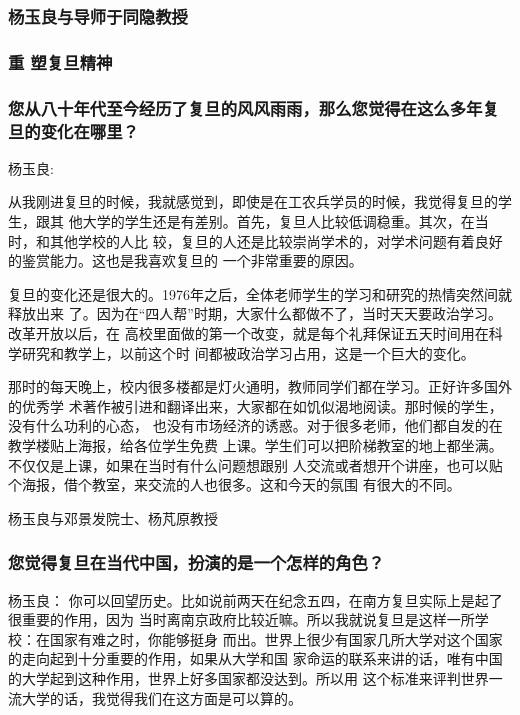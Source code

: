 \documentclass[11pt]{ctexart}
\begin{document}
{{{{\subsubsection{杨玉良与导师于同隐教授}
\label{sec:org4cb509a}
\subsubsection{重 塑复旦精神}
\label{sec:org80a453c}

\subsubsection{您从八十年代至今经历了复旦的风风雨雨，那么您觉得在这么多年复旦的变化在哪里？}
\label{sec:org972734c}
杨玉良:

从我刚进复旦的时候，我就感觉到，即使是在工农兵学员的时候，我觉得复旦的学生，跟其
他大学的学生还是有差别。首先，复旦人比较低调稳重。其次，在当时，和其他学校的人比
较，复旦的人还是比较崇尚学术的，对学术问题有着良好的鉴赏能力。这也是我喜欢复旦的
一个非常重要的原因。

复旦的变化还是很大的。1976年之后，全体老师学生的学习和研究的热情突然间就释放出来
了。因为在“四人帮”时期，大家什么都做不了，当时天天要政治学习。改革开放以后，在
高校里面做的第一个改变，就是每个礼拜保证五天时间用在科学研究和教学上，以前这个时
间都被政治学习占用，这是一个巨大的变化。

那时的每天晚上，校内很多楼都是灯火通明，教师同学们都在学习。正好许多国外的优秀学
术著作被引进和翻译出来，大家都在如饥似渴地阅读。那时候的学生，没有什么功利的心态，
也没有市场经济的诱惑。对于很多老师，他们都自发的在教学楼贴上海报，给各位学生免费
上课。学生们可以把阶梯教室的地上都坐满。不仅仅是上课，如果在当时有什么问题想跟别
人交流或者想开个讲座，也可以贴个海报，借个教室，来交流的人也很多。这和今天的氛围
有很大的不同。


杨玉良与邓景发院士、杨芃原教授

\subsubsection{您觉得复旦在当代中国，扮演的是一个怎样的角色？}
\label{sec:org4430730}
杨玉良：
你可以回望历史。比如说前两天在纪念五四，在南方复旦实际上是起了很重要的作用，因为
当时离南京政府比较近嘛。所以我就说复旦是这样一所学校：在国家有难之时，你能够挺身
而出。世界上很少有国家几所大学对这个国家的走向起到十分重要的作用，如果从大学和国
家命运的联系来讲的话，唯有中国的大学起到这种作用，世界上好多国家都没达到。所以用
这个标准来评判世界一流大学的话，我觉得我们在这方面是可以算的。

}}}}
\end{document}
